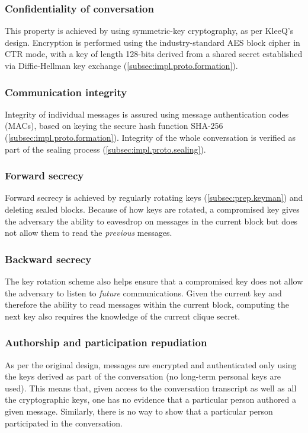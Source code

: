 \documentclass[a4paper, twoside, 12pt]{report}
\begin{document}
\subsubsection{Confidentiality of conversation}
This property is achieved by using symmetric-key cryptography, as per KleeQ's design. Encryption is performed using the industry-standard AES block cipher in CTR mode, with a key of length 128-bits derived from a shared secret established via Diffie-Hellman key exchange (\cref{subsec:impl.proto.formation}).

\subsubsection{Communication integrity}
Integrity of individual messages is assured using message authentication codes (MACs), based on keying the secure hash function SHA-256 (\cref{subsec:impl.proto.formation}). Integrity of the whole conversation is verified as part of the sealing process (\cref{subsec:impl.proto.sealing}).

\subsubsection{Forward secrecy}
Forward secrecy is achieved by regularly rotating keys (\cref{subsec:prep.keyman}) and deleting sealed blocks. Because of how keys are rotated, a compromised key gives the adversary the ability to eavesdrop on messages in the current block but does not allow them to read the \emph{previous} messages. 


\subsubsection{Backward secrecy}
The key rotation scheme also helps ensure that a compromised key does not allow the adversary to listen to \emph{future} communications. Given the current key and therefore the ability to read messages within the current block, computing the next key also requires the knowledge of the current clique secret.

\subsubsection{Authorship and participation repudiation}
As per the original design, messages are encrypted and authenticated only using the keys derived as part of the conversation (no long-term personal keys are used). This means that, given access to the conversation transcript as well as all the cryptographic keys, one has no evidence that a particular person authored a given message. Similarly, there is no way to show that a particular person participated in the conversation.
\end{document}
